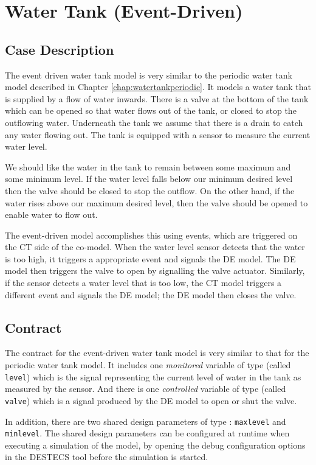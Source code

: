 \chapter{Water Tank (Event-Driven)} \label{chap:watertankeventdriven}
\section{Case Description}
The event driven water tank model is very similar to the periodic
water tank model described in Chapter \ref{chap:watertankperiodic}.
It models a water tank that is supplied by a flow of water inwards.
There is a valve at the bottom of the tank which can be opened so that
water flows out of the tank, or closed to stop the outflowing water.
Underneath the tank we assume that there is a drain to catch any water
flowing out.  The tank is equipped with a sensor to measure the
current water level.

We should like the water in the tank to remain between some maximum
and some minimum level.  If the water level falls below our minimum
desired level then the valve should be closed to stop the outflow.  On
the other hand, if the water rises above our maximum desired level,
then the valve should be opened to enable water to flow out.

The event-driven model accomplishes this using events, which are
triggered on the CT side of the co-model.  When the water level sensor
detects that the water is too high, it triggers a appropriate event
and signals the DE model.  The DE model then triggers the valve to
open by signalling the valve actuator.  Similarly, if the sensor
detects a water level that is too low, the CT model triggers a
different event and signals the DE model; the DE model then closes the
valve.

\section{Contract}
The contract for the event-driven water tank model is very similar to
that for the periodic water tank model.  It includes one
\emph{monitored} variable of type  (called \texttt{level})
which is the signal representing the current level of water in the
tank as measured by the sensor.  And there is one \emph{controlled}
variable of type  (called \texttt{valve}) which is a signal
produced by the DE model to open or shut the valve.

In addition, there are two shared design parameters of type
: \texttt{maxlevel} and \texttt{minlevel}.  The shared
design parameters can be configured at runtime when executing a
simulation of the model, by opening the debug configuration options in
the DESTECS tool before the simulation is started.

